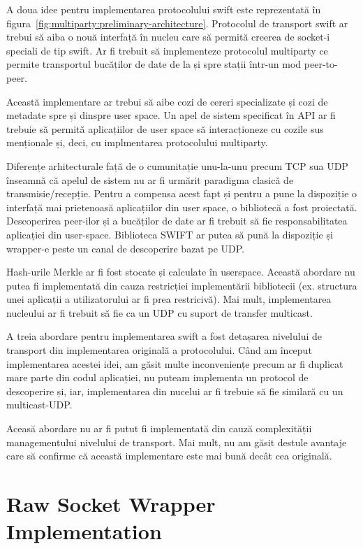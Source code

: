 A doua idee pentru implementarea protocolului swift este reprezentată în
figura~\ref{fig:multiparty:preliminary-architecture}. Protocolul de
transport swift ar trebui să aiba o nouă interfață în nucleu care să
permită creerea de socket-i speciali de tip swift. Ar fi trebuit să
implementeze protocolul multiparty ce permite transportul bucăților de date
de la și spre stații într-un mod peer-to-peer.

Această implementare ar trebui să aibe cozi de cereri specializate și
cozi de metadate spre și dinspre user space. Un apel de sistem specificat
în API ar fi trebuie să permită aplicațiilor de user space să
interacționeze cu cozile sus menționale și, deci, cu implmentarea
protocolului multiparty.

Diferențe arhitecturale față de o cumunitație unu-la-unu precum TCP sua UDP
înseamnă că apelul de sistem nu ar fi urmărit paradigma clasică de
transmisie/recepție. Pentru a compensa acest fapt și pentru a pune la
dispoziție o interfață mai prietenoasă aplicațiilor din user space, o
bibliotecă a fost proiectată. Descoperirea peer-ilor și a bucăților de date
ar fi trebuit să fie responsabilitatea aplicației din user-space.
Biblioteca SWIFT ar putea să pună la dispoziție și wrapper-e peste un canal
de descoperire bazat pe UDP.

Hash-urile Merkle ar fi fost stocate și calculate în userspace. Această
abordare nu putea fi implementată din cauza restricției implementării
bibliotecii (ex. structura unei aplicații a utilizatorului ar fi prea
restricivă). Mai mult, implementarea nucleului ar fi trebuit să fie ca un
UDP cu suport de transfer multicast.

A treia abordare pentru implementarea swift a fost detașarea nivelului de
transport din implementarea originală a protocolului. Când am început
implementarea acestei idei, am găsit multe inconveniențe precum ar fi
duplicat mare parte din codul aplicației, nu puteam implementa un protocol
de descoperire și, iar, implementarea din nucelui ar fi trebuie să fie
similară cu un multicast-UDP.

Aceasă abordare nu ar fi putut fi implementată din cauză complexității
managementului nivelului de transport. Mai mult, nu am găsit destule
avantaje care să confirme că această implementare este mai bună decât cea
originală.

\section{Raw Socket Wrapper Implementation}
\label{sec:multiparty:raw-socket}

